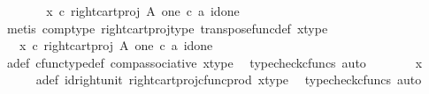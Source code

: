\begin{isabellebody}
\ \ \isamarkupfalse%
\ \isamarkupfalse%
\ {\isachardoublequoteopen}{\isachardot}{\kern0pt}{\isachardot}{\kern0pt}{\isachardot}{\kern0pt}\ {\isacharequal}{\kern0pt}\ {\isacharparenleft}{\kern0pt}x\ {\isasymcirc}\isactrlsub c\ right{\isacharunderscore}{\kern0pt}cart{\isacharunderscore}{\kern0pt}proj\ A\ one{\isacharparenright}{\kern0pt}\ {\isasymcirc}\isactrlsub c\ {\isasymlangle}a{\isacharcomma}{\kern0pt}\ id{\isacharparenleft}{\kern0pt}one{\isacharparenright}{\kern0pt}{\isasymrangle}{\isachardoublequoteclose}\isanewline
\ \ \ \ \isamarkupfalse%
\ {\isacharparenleft}{\kern0pt}metis\ comp{\isacharunderscore}{\kern0pt}type\ right{\isacharunderscore}{\kern0pt}cart{\isacharunderscore}{\kern0pt}proj{\isacharunderscore}{\kern0pt}type\ transpose{\isacharunderscore}{\kern0pt}func{\isacharunderscore}{\kern0pt}def\ x{\isacharunderscore}{\kern0pt}type{}{\isacharparenright}{\kern0pt}\ \isanewline
\ \ \isamarkupfalse%
\ \isamarkupfalse%
\ {\isachardoublequoteopen}{\isachardot}{\kern0pt}{\isachardot}{\kern0pt}{\isachardot}{\kern0pt}\ {\isacharequal}{\kern0pt}\ x\ {\isasymcirc}\isactrlsub c\ {\isacharparenleft}{\kern0pt}right{\isacharunderscore}{\kern0pt}cart{\isacharunderscore}{\kern0pt}proj\ A\ one\ {\isasymcirc}\isactrlsub c\ {\isasymlangle}a{\isacharcomma}{\kern0pt}\ id{\isacharparenleft}{\kern0pt}one{\isacharparenright}{\kern0pt}{\isasymrangle}{\isacharparenright}{\kern0pt}{\isachardoublequoteclose}\isanewline
\ \ \ \ \isamarkupfalse%
\ a{\isacharunderscore}{\kern0pt}def\ cfunc{\isacharunderscore}{\kern0pt}type{\isacharunderscore}{\kern0pt}def\ comp{\isacharunderscore}{\kern0pt}associative\ x{\isacharunderscore}{\kern0pt}type{}\ \isamarkupfalse%
\ {\isacharparenleft}{\kern0pt}typecheck{\isacharunderscore}{\kern0pt}cfuncs{\isacharcomma}{\kern0pt}\ auto{\isacharparenright}{\kern0pt}\isanewline
\ \ \isamarkupfalse%
\ \isamarkupfalse%
\ {\isachardoublequoteopen}{\isachardot}{\kern0pt}{\isachardot}{\kern0pt}{\isachardot}{\kern0pt}\ {\isacharequal}{\kern0pt}\ x{\isachardoublequoteclose}\isanewline
\ \ \ \ \isamarkupfalse%
\ a{\isacharunderscore}{\kern0pt}def\ id{\isacharunderscore}{\kern0pt}right{\isacharunderscore}{\kern0pt}unit{}\ right{\isacharunderscore}{\kern0pt}cart{\isacharunderscore}{\kern0pt}proj{\isacharunderscore}{\kern0pt}cfunc{\isacharunderscore}{\kern0pt}prod\ x{\isacharunderscore}{\kern0pt}type{}\ \isamarkupfalse%
\ {\isacharparenleft}{\kern0pt}typecheck{\isacharunderscore}{\kern0pt}cfuncs{\isacharcomma}{\kern0pt}\ auto{\isacharparenright}{\kern0pt}\isanewline

\end{isabellebody}
